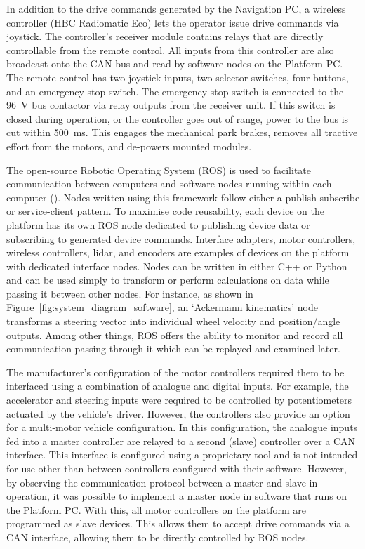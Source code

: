 \documentclass[preprint,authoryear,12pt]{elsarticle}
\begin{document}
        In addition to the drive commands generated by the Navigation PC, a wireless controller (HBC Radiomatic Eco) lets the operator issue drive commands via joystick.
        The controller's receiver module contains relays that are directly controllable from the remote control.
        All inputs from this controller are also broadcast onto the CAN bus and read by software nodes on the Platform PC.
        The remote control has two joystick inputs, two selector switches, four buttons, and an emergency stop switch.
        The emergency stop switch is connected to the \SI{96}{\volt} bus contactor via relay outputs from the receiver unit.
        If this switch is closed during operation, or the controller goes out of range, power to the bus is cut within \SI{500}{\milli\second}.
        This engages the mechanical park brakes, removes all tractive effort from the motors, and de-powers mounted modules.

        The open-source Robotic Operating System (ROS) is used to facilitate communication between computers and software nodes running within each computer (\cite{quigley2009}).
        Nodes written using this framework follow either a publish-subscribe or service-client pattern.
        To maximise code reusability, each device on the platform has its own ROS node dedicated to publishing device data or subscribing to generated device commands.
        Interface adapters, motor controllers, wireless controllers, lidar, and encoders are examples of devices on the platform with dedicated interface nodes.
        Nodes can be written in either C++ or Python and can be used simply to transform or perform calculations on data while passing it between other nodes.
        For instance, as shown in Figure~\ref{fig:system_diagram_software}, an `Ackermann kinematics' node transforms a steering vector into individual wheel velocity and position/angle outputs.
        Among other things, ROS offers the ability to monitor and record all communication passing through it which can be replayed and examined later.

        The manufacturer's configuration of the motor controllers required them to be interfaced using a combination of analogue and digital inputs.
        For example, the accelerator and steering inputs were required to be controlled by potentiometers actuated by the vehicle's driver.
        However, the controllers also provide an option for a multi-motor vehicle configuration.
        In this configuration, the analogue inputs fed into a master controller are relayed to a second (slave) controller over a CAN interface.
        This interface is configured using a proprietary tool and is not intended for use other than between controllers configured with their software.
        However, by observing the communication protocol between a master and slave in operation, it was possible to implement a master node in software that runs on the Platform PC.
        With this, all motor controllers on the platform are programmed as slave devices.
        This allows them to accept drive commands via a CAN interface, allowing them to be directly controlled by ROS nodes.
\end{document}
